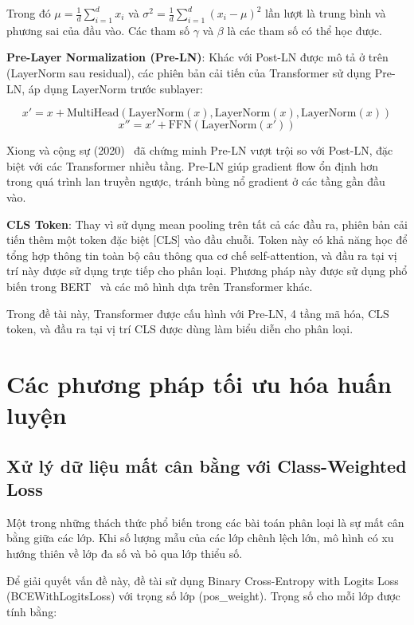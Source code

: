 \documentclass[../BTL.tex]{subfiles}
\begin{document}
Trong đó $\mu = \frac{1}{d} \sum_{i=1}^{d} x_i$ và $\sigma^2 = \frac{1}{d} \sum_{i=1}^{d} (x_i - \mu)^2$ lần lượt là trung bình và phương sai của đầu vào. Các tham số $\gamma$ và $\beta$ là các tham số có thể học được.

\textbf{Pre-Layer Normalization (Pre-LN)}: Khác với Post-LN được mô tả ở trên (LayerNorm sau residual), các phiên bản cải tiến của Transformer sử dụng Pre-LN, áp dụng LayerNorm trước sublayer:

\begin{equation}
    x' = x + \text{MultiHead}(\text{LayerNorm}(x), \text{LayerNorm}(x), \text{LayerNorm}(x))
\end{equation}
\begin{equation}
    x'' = x' + \text{FFN}(\text{LayerNorm}(x'))
\end{equation}

Xiong và cộng sự (2020)~\cite{xiong2020layer} đã chứng minh Pre-LN vượt trội so với Post-LN, đặc biệt với các Transformer nhiều tầng. Pre-LN giúp gradient flow ổn định hơn trong quá trình lan truyền ngược, tránh bùng nổ gradient ở các tầng gần đầu vào.

\textbf{CLS Token}: Thay vì sử dụng mean pooling trên tất cả các đầu ra, phiên bản cải tiến thêm một token đặc biệt [CLS] vào đầu chuỗi. Token này có khả năng học để tổng hợp thông tin toàn bộ câu thông qua cơ chế self-attention, và đầu ra tại vị trí này được sử dụng trực tiếp cho phân loại. Phương pháp này được sử dụng phổ biến trong BERT~\cite{devlin2019bert} và các mô hình dựa trên Transformer khác.

Trong đề tài này, Transformer được cấu hình với Pre-LN, 4 tầng mã hóa, CLS token, và đầu ra tại vị trí CLS được dùng làm biểu diễn cho phân loại.

\section{Các phương pháp tối ưu hóa huấn luyện}

\subsection{Xử lý dữ liệu mất cân bằng với Class-Weighted Loss}
Một trong những thách thức phổ biến trong các bài toán phân loại là sự mất cân bằng giữa các lớp. Khi số lượng mẫu của các lớp chênh lệch lớn, mô hình có xu hướng thiên về lớp đa số và bỏ qua lớp thiểu số.

Để giải quyết vấn đề này, đề tài sử dụng Binary Cross-Entropy with Logits Loss (BCEWithLogitsLoss) với trọng số lớp (pos\_weight). Trọng số cho mỗi lớp được tính bằng:
\end{document}
